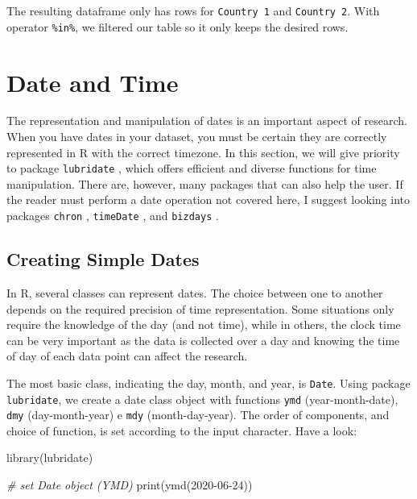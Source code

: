 \documentclass[
  12pt,
]{book}
\newenvironment{Shaded}{\begin{snugshade}}{\end{snugshade}}
\newcommand{\CommentTok}[1]{\textcolor[rgb]{0.37,0.37,0.37}{\textit{#1}}}
\newcommand{\FunctionTok}[1]{\textcolor[rgb]{0,0,0}{#1}}
\newcommand{\NormalTok}[1]{#1}
\newcommand{\StringTok}[1]{\textcolor[rgb]{0.5,0.5,0.5}{#1}}
\begin{document}
The resulting dataframe only has rows for \texttt{\textquotesingle{}Country\ 1\textquotesingle{}} and \texttt{\textquotesingle{}Country\ 2\textquotesingle{}}. With operator \texttt{\%in\%}, we filtered our table so it only keeps the desired rows.

\hypertarget{date-and-time}{%
\section{Date and Time}\label{date-and-time}}

The representation and manipulation of dates is an important aspect of research. When you have dates in your dataset, you must be certain they are correctly represented in R with the correct timezone. In this section, we will give priority to package \texttt{lubridate} \citep{R-lubridate}, which offers efficient and diverse functions for time manipulation. There are, however, many packages that can also help the user. If the reader must perform a date operation not covered here, I suggest looking into packages \texttt{chron} \citep{R-chron}, \texttt{timeDate} \citep{R-timeDate}, and \texttt{bizdays} \citep{R-bizdays}.    

\hypertarget{creating-simple-dates}{%
\subsection{Creating Simple Dates}\label{creating-simple-dates}}

In R, several classes can represent dates. The choice between one to another depends on the required precision of time representation. Some situations only require the knowledge of the day (and not time), while in others, the clock time can be very important as the data is collected over a day and knowing the time of day of each data point can affect the research.

The most basic class, indicating the day, month, and year, is \texttt{Date}. Using package \texttt{lubridate}, we create a date class object with functions \texttt{ymd} (year-month-date), \texttt{dmy} (day-month-year) e \texttt{mdy} (month-day-year). The order of components, and choice of function, is set according to the input character. Have a look:   

\begin{Shaded}
\begin{Highlighting}[]
\FunctionTok{library}\NormalTok{(lubridate)}

\CommentTok{\# set Date object (YMD)}
\FunctionTok{print}\NormalTok{(}\FunctionTok{ymd}\NormalTok{(}\StringTok{\textquotesingle{}2020{-}06{-}24\textquotesingle{}}\NormalTok{))}
\end{Highlighting}
\end{Shaded}
\end{document}
